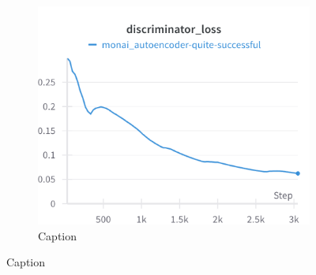 \begin{figure}[H]
\hfill
\begin{subfigure}[h]{.45\linewidth}
    \includegraphics[width=\linewidth]{detailed_engineering/Monai Autoencoder/charts/discriminator_loss.png}
    \caption{Caption}
    \label{fig:enter-label}
\end{subfigure}
\hfill
\end{figure}


